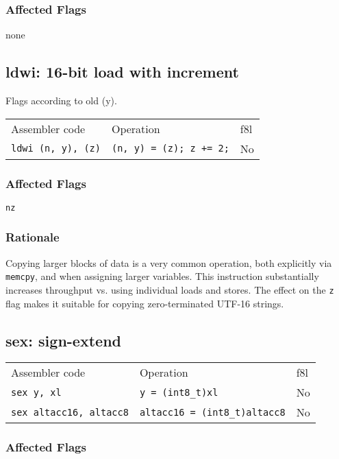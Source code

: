\documentclass{book}
\begin{document}
\subsubsection*{Affected Flags}

none


\subsection{ldwi: 16-bit load with increment}

Flags according to old (y).

\begin{tabular}{l l l}
Assembler code         & Operation                         & f8l \\
\texttt{ldwi (n, y), (z)} & \texttt{(n, y) = (z); z += 2;} & No \\
\end{tabular}

\subsubsection*{Affected Flags}

\texttt{nz}

\subsubsection*{Rationale}

Copying larger blocks of data is a very common operation, both explicitly via \texttt{memcpy}, and when assigning larger variables. This instruction substantially increases throughput vs. using individual loads and stores. The effect on the \texttt{z} flag makes it suitable for copying zero-terminated UTF-16 strings.

\subsection{sex: sign-extend}

\begin{tabular}{l l l}
Assembler code                 & Operation                            & f8l \\
\texttt{sex y, xl}             & \texttt{y = (int8\_t)xl}             & No \\
\texttt{sex altacc16, altacc8} & \texttt{altacc16 = (int8\_t)altacc8} & No \\
\end{tabular}

\subsubsection*{Affected Flags}
\end{document}

